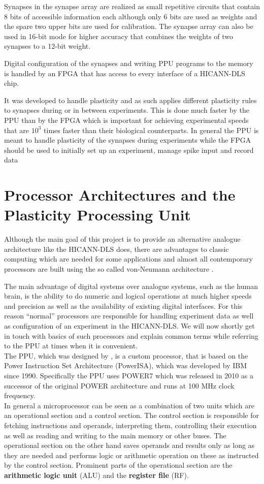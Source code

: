 Synapses in the synapse array are realized as small repetitive circuits that contain 8 bits of accessible information each although only 6 bits are used as weights and the spare two upper bits are used for calibration.
The synapse array can also be used in 16-bit mode for higher accuracy that combines the weights of two synapses to a 12-bit weight.

Digital configuration of the synapses and writing PPU programs to the memory is handled by an FPGA that has access to every interface of a HICANN-DLS chip.

It was developed to handle plasticity and as such applies different plasticity rules to synapses during or in between experiments.
This is done much faster by the PPU than by the FPGA which is important for achieving experimental speeds that are $10^{3}$ times faster than their biological counterparts.
In general the PPU is meant to handle plasticity of the synapses during experiments while the FPGA should be used to initially set up an experiment, manage spike input and record data 

\section{Processor Architectures and the Plasticity Processing Unit}
Although the main goal of this project is to provide an alternative analogue architecture like the HICANN-DLS does, there are advantages to classic computing which are needed for some applications and almost all contemporary processors are built using the so called von-Neumann architecture .

The main advantage of digital systems over analogue systems, such as the human brain, is the ability to do numeric and logical operations at much higher speeds and precision as well as the availability of existing digital interfaces.
For this reason ``normal'' processors are responsible for handling experiment data as well as configuration of an experiment in the HICANN-DLS.
We will now shortly get in touch with basics of such processors and explain common terms while referring to the PPU at times when it is convenient.
\\
The PPU, which was designed by \citep{PPU}, is a custom processor, that is based on the Power Instruction Set Architecture (PowerISA), which was developed by IBM since 1990. 
Specifically the PPU uses POWER7 which was released in 2010 as a successor of the original POWER architecture and runs at 100 MHz clock frequency.
\\
In general a microprocessor can be seen as a combination of two units which are an operational section and a control section.
The control section is responsible for fetching instructions and operands, interpreting them, controlling their execution as well as reading and writing to the main memory or other buses.
The operational section on the other hand saves operands and results only as long as they are needed and performs logic or arithmetic operation on these as instructed by the control section.
Prominent parts of the operational section are the \textbf{arithmetic logic unit} (ALU) and the \textbf{register file} (RF).

